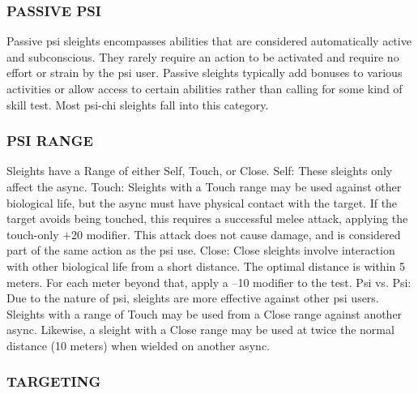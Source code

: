 \subsubsection{PASSIVE PSI}

Passive psi sleights encompasses abilities that are considered
automatically active and subconscious. They
rarely require an action to be activated and require
no effort or strain by the psi user. Passive sleights typically
add bonuses to various activities or allow access
to certain abilities rather than calling for some kind of
skill test. Most psi-chi sleights fall into this category.

\subsubsection{PSI RANGE}

Sleights have a Range of either Self, Touch, or Close.
Self: These sleights only affect the async.
Touch: Sleights with a Touch range may be used
against other biological life, but the async must have
physical contact with the target. If the target avoids
being touched, this requires a successful melee attack,
applying the touch-only +20 modifier. This attack
does not cause damage, and is considered part of the
same action as the psi use.
Close: Close sleights involve interaction with other
biological life from a short distance. The optimal distance
is within 5 meters. For each meter beyond that,
apply a –10 modifier to the test.
Psi vs. Psi: Due to the nature of psi, sleights are
more effective against other psi users. Sleights with
a range of Touch may be used from a Close range
against another async. Likewise, a sleight with a Close
range may be used at twice the normal distance (10
meters) when wielded on another async.

\subsubsection{TARGETING}

